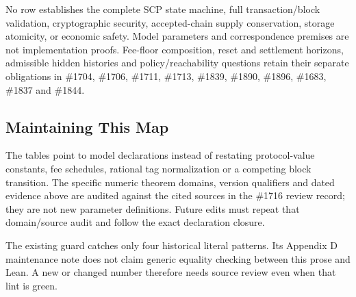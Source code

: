 No row establishes the complete SCP state machine, full transaction/block
validation, cryptographic security, accepted-chain supply conservation,
storage atomicity, or economic safety. Model parameters and correspondence
premises are not implementation proofs. Fee-floor composition, reset and
settlement horizons, admissible hidden histories and policy/reachability
questions retain their separate obligations in \#1704, \#1706, \#1711,
\#1713, \#1839, \#1890, \#1896, \#1683, \#1837 and \#1844.

\subsection{Maintaining This Map}

The tables point to model declarations instead of restating protocol-value
constants, fee schedules, rational tag normalization or a competing block
transition. The specific numeric theorem domains, version qualifiers and
dated evidence above are audited against the cited sources in the \#1716
review record; they are not new parameter definitions. Future edits must
repeat that domain/source audit and follow the exact declaration closure.

The existing  guard catches only
four historical literal patterns. Its Appendix D maintenance note does not
claim generic equality checking between this prose and Lean. A new or
changed number therefore needs source review even when that lint is green.

\endgroup
